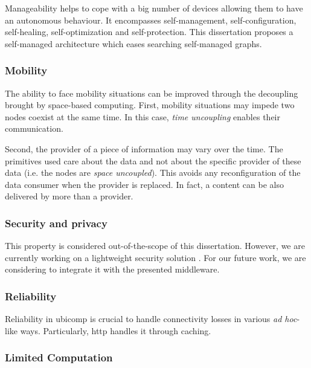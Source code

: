 Manageability helps to cope with a big number of devices allowing them to have an autonomous behaviour. %
It encompasses self-management, self-configuration, self-healing, self-optimization and self-protection.
This dissertation proposes a self-managed architecture which eases searching self-managed graphs.


\subsubsection{Mobility}

The ability to face mobility situations can be improved through the decoupling brought by space-based computing.
First, mobility situations may impede two nodes coexist at the same time.
In this case, \emph{time uncoupling} enables their communication.

Second, the provider of a piece of information may vary over the time.
The primitives used care about the data and not about the specific provider of these data (i.e. the nodes are \emph{space uncoupled}).
This avoids any reconfiguration of the data consumer when the provider is replaced.
In fact, a content can be also delivered by more than a provider.


\subsubsection{Security and privacy}

This property is considered out-of-the-scope of this dissertation.
However, we are currently working on a lightweight security solution \citep{naranjo_lightweight_2012}. %
For our future work, we are considering to integrate it with the presented middleware.


\subsubsection{Reliability}

Reliability in \ac{ubicomp} is crucial to handle connectivity losses in various \emph{ad hoc}-like ways.
Particularly, \ac{http} handles it through caching.


\subsubsection{Limited Computation}

